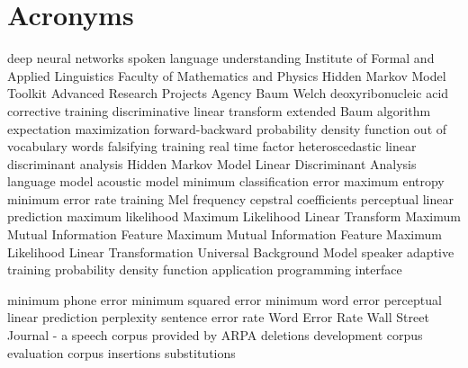\chapter{Acronyms}
\label{cha:acronyms}

\begin{acronym}[TDMA]
     {deep neural networks}
     {spoken language understanding}
     {Institute of Formal and Applied Linguistics}
     {Faculty of Mathematics and Physics}
     {Hidden Markov Model Toolkit}
     {Advanced Research Projects Agency}
     {Baum Welch}
     {deoxyribonucleic acid}
     {corrective training}
     {discriminative linear transform}
     {extended Baum algorithm}
     {expectation maximization}
     {forward-backward}
     {probability density function}
     {out of vocabulary words}
     {falsifying training}
     {real time factor}
     {heteroscedastic linear discriminant analysis}
     {Hidden Markov Model}
     {Linear Discriminant Analysis}
     {language model}
     {acoustic model}
     {minimum classification error}
     {maximum entropy}
     {minimum error rate training}
     {Mel frequency cepstral coefficients}
     {perceptual linear prediction}
     {maximum likelihood}
     {Maximum Likelihood Linear Transform}
     {Maximum Mutual Information}
     {Feature Maximum Mutual Information}
     {Feature Maximum Likelihood Linear Transformation}
     {Universal Background Model}
     {speaker adaptive training}
     {probability density function}
     {application programming interface}

     {minimum phone error}
     {minimum squared error}
     {minimum word error}
     {perceptual linear prediction}
     {perplexity}
     {sentence error rate}
     {Word Error Rate}
     {Wall Street Journal - a speech corpus provided by ARPA}
     {deletions}
     {development corpus}
     {evaluation corpus}
     {insertions}
     {substitutions}
\end{acronym}

